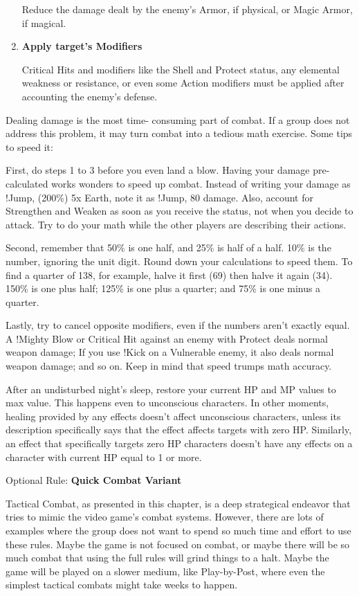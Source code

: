 \begin{multicols}{2}
\begin{enumerate}
Reduce the damage dealt by the enemy's
Armor, if physical, or Magic Armor, if magical.

\item \textbf{Apply target's Modifiers}

Critical Hits and modifiers like the Shell and
Protect status, any elemental weakness or
resistance, or even some Action modifiers must be
applied after accounting the enemy's defense.
\end{enumerate}

Dealing damage is the most time-
consuming part of combat. If a group does not
address this problem, it may turn combat into a
tedious math exercise. Some tips to speed it:

First, do steps 1 to 3 before you even land
a blow. Having your damage pre-calculated
works wonders to speed up combat. Instead of
writing your damage as !Jump, (200\%) 5x Earth,
note it as !Jump, 80 damage. Also, account for
Strengthen and Weaken as soon as you receive
the status, not when you decide to attack. Try to
do your math while the other players are
describing their actions.

Second, remember that 50\% is one half,
and 25\% is half of a half. 10\% is the number,
ignoring the unit digit. Round down your
calculations to speed them. To find a quarter of
138, for example, halve it first (69) then halve it
again (34). 150\% is one plus half; 125\% is one
plus a quarter; and 75\% is one minus a quarter.

Lastly, try to cancel opposite modifiers,
even if the numbers aren't exactly equal.
A !Mighty Blow or Critical Hit against an enemy
with Protect deals normal weapon damage; If you
use !Kick on a Vulnerable enemy, it also deals
normal weapon damage; and so on. Keep in mind
that speed trumps math accuracy.

After an undisturbed night's sleep, restore
your current HP and MP values to max value. This
happens even to unconscious characters. In other
moments, healing provided by any effects doesn’t
affect unconscious characters, unless its
description specifically says that the effect affects
targets with zero HP. Similarly, an effect that
specifically targets zero HP characters doesn’t
have any effects on a character with current HP
equal to 1 or more.

Optional Rule: \textbf{Quick Combat Variant}

Tactical Combat, as presented in this
chapter, is a deep strategical endeavor that tries
to mimic the video game's combat systems.
However, there are lots of examples where the
group does not want to spend so much time and
effort to use these rules. Maybe the game is not
focused on combat, or maybe there will be so
much combat that using the full rules will grind
things to a halt. Maybe the game will be played
on a slower medium, like Play-by-Post, where
even the simplest tactical combats might take
weeks to happen.


\end{multicols}
